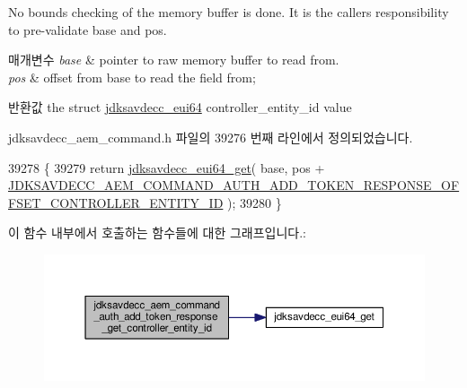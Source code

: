 No bounds checking of the memory buffer is done. It is the caller\textquotesingle{}s responsibility to pre-\/validate base and pos.


\begin{DoxyParams}{매개변수}
{\em base} & pointer to raw memory buffer to read from. \\
\hline
{\em pos} & offset from base to read the field from; \\
\hline
\end{DoxyParams}
\begin{DoxyReturn}{반환값}
the struct \hyperlink{structjdksavdecc__eui64}{jdksavdecc\+\_\+eui64} controller\+\_\+entity\+\_\+id value 
\end{DoxyReturn}


jdksavdecc\+\_\+aem\+\_\+command.\+h 파일의 39276 번째 라인에서 정의되었습니다.


\begin{DoxyCode}
39278 \{
39279     \textcolor{keywordflow}{return} \hyperlink{group__eui64_ga2652311a25a6b91cddbed75c108c7031}{jdksavdecc\_eui64\_get}( base, pos + 
      \hyperlink{group__command__auth__add__token__response_gadb692d7cfcca5ad4e11ecf98066fd264}{JDKSAVDECC\_AEM\_COMMAND\_AUTH\_ADD\_TOKEN\_RESPONSE\_OFFSET\_CONTROLLER\_ENTITY\_ID}
       );
39280 \}
\end{DoxyCode}


이 함수 내부에서 호출하는 함수들에 대한 그래프입니다.\+:
\nopagebreak
\begin{figure}[H]
\begin{center}
\leavevmode
\includegraphics[width=350pt]{group__command__auth__add__token__response_gaf4caf7faeecb2d0814dc79febecb9422_cgraph}
\end{center}
\end{figure}


